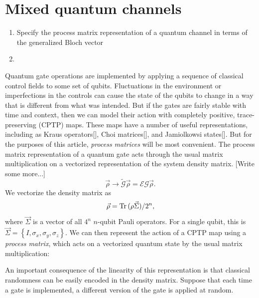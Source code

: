\documentclass[aps,nofootinbib,pra,notitlepage,twocolumn]{revtex4-1}
\newcommand{\tr}{{\rm Tr\thinspace}}
\newcommand{\note}[1]{{\color{red}[#1]}}
\newcommand{\actual}{\ensuremath{\tilde{\mathcal{G}}}}
\newcommand{\target}{\ensuremath{{\mathcal{G}}}}
\newcommand{\error}{\ensuremath{{\mathcal{E}}}}
\begin{document}
\section{Mixed quantum channels}
\label{sec:representing_quantum_gates}
\begin{enumerate}
	\item Specify the process matrix representation of a quantum channel in terms of the generalized Bloch vector
	\item 
\end{enumerate}
Quantum gate operations are implemented by applying a sequence of classical control fields to some set of qubits. Fluctuations in the environment or imperfections in the controls can cause the state of the qubits to change in a way that is different from what was intended.  But if the gates are fairly stable with time and context\cite{1810.05651}, then we can model their action with completely positive, trace-preserving (CPTP) maps. These maps have a number of useful representations, including as Kraus operators[], Choi matrices[], and Jamiolkowsi states[]. But for the purposes of this article, \emph{process matrices} will be most convenient. The process matrix representation of a quantum gate acts through the usual matrix multiplication on a vectorized representation of the system density matrix. \note{Write some more...}
\begin{equation}\label{error_def}
  \vec\rho \rightarrow \actual\vec\rho = \error \target \vec\rho.
\end{equation}
We vectorize the density matrix as
\begin{equation}
  \vec \rho = \tr(\rho \vec \Sigma)/2^n,
\end{equation}
where $\vec \Sigma$ is a vector of all $4^n$ $n$-qubit Pauli operators. For a single qubit, this is $\vec\Sigma = \left\{I, \sigma_x, \sigma_y, \sigma_z\right\}$.  We can then represent the action of a CPTP map using a \emph{process matrix}, which acts on a vectorized quantum state by the usual matrix multiplication:



An important consequence of the linearity of this representation is that classical randomness can be easily encoded in the density matrix. Suppose that each time a gate is implemented, a different version of the gate is applied at random. 
\end{document}
